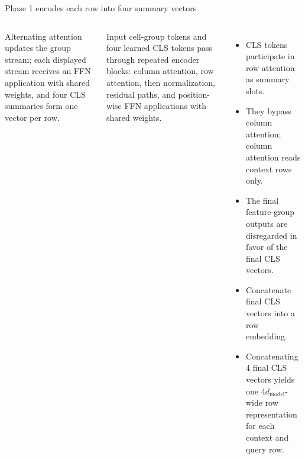 \documentclass[11pt,aspectratio=169,hyperref={colorlinks}]{beamer}
\newcommand{\visualdescription}[1]{\par\vspace{.2em}\noindent\parbox{\linewidth}{\centering\tiny\color{sourcegray}#1}}
\begin{document}
\begin{frame}{Phase 1 encodes each row into four summary vectors}
\begin{columns}[c]
\visualdescription{Alternating attention updates the group stream; each displayed stream receives an FFN application with shared weights, and four CLS summaries form one vector per row.}
\scriptsize
Input cell-group tokens and four learned CLS tokens pass through repeated encoder blocks: column attention, row attention, then normalization, residual paths, and position-wise FFN applications with shared weights.
\begin{itemize}\itemsep.3em
\item CLS tokens participate in row attention as summary slots.
\item They bypass column attention; column attention reads context rows only.
\item The final feature-group outputs are disregarded in favor of the final CLS vectors.
\item Concatenate final CLS vectors into a row embedding.
\item Concatenating 4 final CLS vectors yields one $4d_{\text{model}}$-wide row representation for each context and query row.
\end{itemize}
\end{columns}
\vspace{2mm}
\end{frame}
\end{document}
